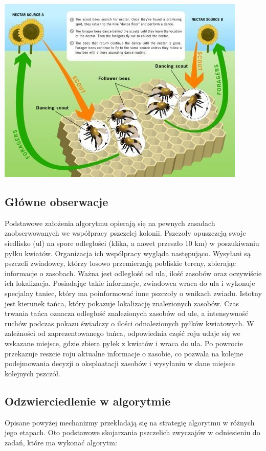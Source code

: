 \documentclass[a4paper,12pt,notitlepage]{mwrep}
\begin{document}
\includegraphics{./images/pszczoly.jpeg}

\subsection{Główne obserwacje}
Podstawowe założenia algorytmu opierają się na pewnych zasadach zaobserwowanych we współpracy pszczelej kolonii. Pszczoły opuszczeją swoje siedlisko (ul) na spore odległości (klika, a nawet przeszło 10 km) w poszukiwaniu pyłku kwiatów. Organizacja ich wspólpracy wygląda następująco. Wysyłani są pszczeli zwiadowcy, którzy losowo przemierzają pobliskie tereny, zbierając informacje o zasobach. Ważna jest odległość od ula, ilość zasobów oraz oczywiście ich lokalizacja. Posiadając takie informacje, zwiadowca wraca do ula i wykonuje specjalny taniec, który ma poinformować inne pszczoły o wnikach zwiadu. Istotny jest kierunek tańca, który pokazuje lokalizację znalezionych zasobów. Czas trwania tańca oznacza odległość znalezionych zasobów od ule, a intensywność ruchów podczas pokazu świadczy o ilości odnalezionych pyłków kwiatowych. W zależności od zaprezentowanego tańca, odpowiednia część roju udaje się we wskazane miejsce, gdzie zbiera pyłek z kwiatów i wraca do ula. Po powrocie przekazuje reszcie roju aktualne informacje o zasobie, co pozwala na kolejne podejmowania decyzji o oksploatacji zasobów i wysyłaniu w dane miejsce kolejnych pszczół.

\subsection{Odzwierciedlenie w algorytmie}
Opisane powyżej mechanizmy przekładają się na strategię algorytmu w różnych jego etapach. Oto podstawowe skojarzania pszczelich zwyczajów w odniesieniu do zadań, które ma wykonać algorytm:
\end{document}
